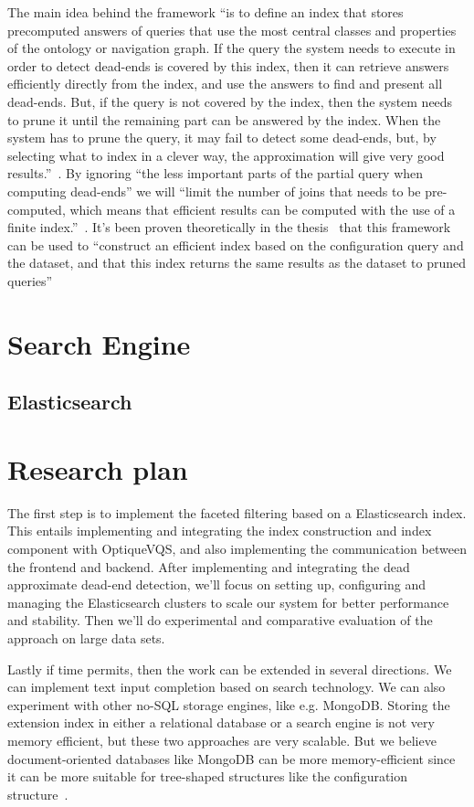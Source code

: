 \documentclass[a4paper,english]{ifimaster/ifimaster}
\begin{document}
The main idea behind the framework ``is to define an index that stores precomputed answers of queries that use the most central classes and properties of the ontology or navigation graph. If the query the system needs to execute in order to detect dead-ends is covered by this index, then it can retrieve answers efficiently directly from the index, and use the answers to find and present all dead-ends. But, if the query is not covered by the index, then the system needs to prune it until the remaining part can be answered by the index. When the system has to prune the query, it may fail to detect some dead-ends, but, by selecting what to index in a clever way, the approximation will give very good results.''~\cite{vidar-phd-2020}. By ignoring ``the less important parts of the partial query when computing dead-ends'' we will ``limit the number of joins that needs to be pre-computed, which means that efficient results can be computed with the use of a finite index.''~\cite{vidar-phd-2020}. It's been proven theoretically in the thesis~\cite{vidar-phd-2020} that this framework can be used to ``construct an efficient index based on the configuration query and the dataset, and that this index returns the same results as the dataset to pruned queries''~\cite{vidar-phd-2020}

\section{Search Engine}
\subsection{Elasticsearch}


\section{Research plan}
The first step is to implement the faceted filtering based on a Elasticsearch index. This entails implementing and integrating the index construction and index component with OptiqueVQS, and also implementing the communication between the frontend and backend. After implementing and integrating the dead approximate dead-end detection, we'll focus on setting up, configuring and managing the Elasticsearch clusters to scale our system for better performance and stability. Then we'll do experimental and comparative evaluation of the approach on large data sets. 

Lastly if time permits, then the work can be extended in several directions. We can implement text input completion based on search technology. We can also experiment with other no-SQL storage engines, like e.g. MongoDB. Storing the extension index in either a relational database or a search engine is not very memory efficient, but these two approaches are very scalable. But we believe document-oriented databases like MongoDB can be more memory-efficient since it can be more suitable for tree-shaped structures like the configuration structure~\cite{vidar-phd-2020}.   
\end{document}
